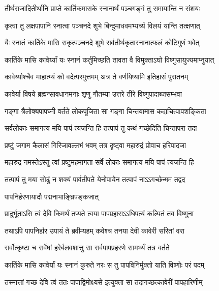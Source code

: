 \twolineshloka
{तीर्थराजादितीर्थानि प्राप्ते कार्तिकमासके}
{स्नानार्थं पञ्चगङ्गं तु समायान्ति न संशयः} %

\twolineshloka
{कृत्वा तु लक्षपापानि स्नात्वा पञ्चनदे शुभे}
{बिन्दुमाधवमभ्यर्च्य विलयं यान्ति तत्क्षणात्} %

\twolineshloka
{यैः स्नातं कार्तिके मासि सकृत्पञ्चनदे शुभे}
{सर्वतीर्थकृतास्नानात्फलं कोटिगुणं भवेत्} %


\twolineshloka
{कार्तिके मासि कावेर्य्यां यः स्नानं कर्तुमिच्छति}
{तावता वै विमुक्ताऽघो विष्णुसायुज्यमाप्नुयात्} %

\twolineshloka
{कावेर्य्याश्चैव माहात्म्यं को वदेत्परमुत्तमम्}
{अत्र ते वर्णयिष्यामि इतिहासं पुरातनम्} %

\twolineshloka
{कावेर्या विषये ब्रह्मन्सावधानमनाः शृणु}
{गौतम्या उत्तरे तीरे विष्णुपादाब्जसम्भवा} %

\twolineshloka
{गङ्गा त्रैलोक्यपापघ्नी वर्तते लोकपूजिता}
{सा गङ्गा चिन्तयामास कदाचित्पापशङ्किता} %

\twolineshloka
{सर्वलोकाः समागत्य मयि पापं त्यजन्ति हि}
{तत्पापं तु कथं गच्छेदिति चिन्तापरा तदा} %

\twolineshloka
{प्रष्टुं जगाम कैलासं गिरिजावल्लभं भवम्}
{तत्र दृष्ट्वा महारुद्रं प्रोवाच हरिपादजा} %


\twolineshloka
{महारुद्र नमस्तेऽस्तु त्वां प्रष्टुमहमागता}
{सर्वे लोकाः समागत्य मयि पापं त्यजन्ति हि} %

\twolineshloka
{तत्पापं तु मया सोढुं न शक्यं पार्वतीपते}
{येनोपायेन तत्पापं नाऽऽगच्छेन्मम तद्वद} %




\onelineshloka
{पापनिर्हरणायादौ पद्मनाभाङ्घ्रिपङ्कजात्} %

\twolineshloka
{प्रादुर्भूताऽसि त्वं देवि किमर्थं तप्यते त्वया}
{पापप्रहाराऽऽधिपत्यं कल्पितं तव विष्णुना} %

\twolineshloka
{तथाऽपि पापनिर्हार उपायं ते ब्रवीम्यहम्}
{कवेश्च तनया देवी कावेरी सरितां वरा} %

\twolineshloka
{सर्वोत्कृष्टा च सर्वेषां हरेर्बलवशात्तु सा}
{सर्वपापप्रहरणे सामर्थ्यं तत्र वर्तते} %

\twolineshloka
{कार्तिके मासि कावेर्यां यः स्नानं कुरुते नरः}
{स तु पापविनिर्मुक्तो याति विष्णोः परं पदम्} %

\twolineshloka
{तस्मात्तां गच्छ देवि त्वं ततः पापाद्विमोक्ष्यसे}
{इत्युक्ता सा तदागच्छत्कावेरीं पापहारिणीम्} %


